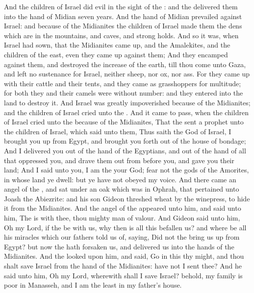 \begin{biblechapter} %
 And the children of Israel did evil in the sight of the \LORD: and the \LORD delivered them into the hand of Midian seven years.
\verse And the hand of Midian prevailed against Israel: and because of the Midianites the children of Israel made them the dens which are in the mountains, and caves, and strong holds.
\verse And so it was, when Israel had sown, that the Midianites came up, and the Amalekites, and the children of the east, even they came up against them;
\verse And they encamped against them, and destroyed the increase of the earth, till thou come unto Gaza, and left no sustenance for Israel, neither sheep, nor ox, nor ass.
\verse For they came up with their cattle and their tents, and they came as grasshoppers for multitude; for both they and their camels were without number: and they entered into the land to destroy it.
\verse And Israel was greatly impoverished because of the Midianites; and the children of Israel cried unto the \LORD.
\verse And it came to pass, when the children of Israel cried unto the \LORD because of the Midianites,
\verse That the \LORD sent a prophet unto the children of Israel, which said unto them, Thus saith the \LORD God of Israel, I brought you up from Egypt, and brought you forth out of the house of bondage;
\verse And I delivered you out of the hand of the Egyptians, and out of the hand of all that oppressed you, and drave them out from before you, and gave you their land;
\verse And I said unto you, I am the \LORD your God; fear not the gods of the Amorites, in whose land ye dwell: but ye have not obeyed my voice.
\verse And there came an angel of the \LORD, and sat under an oak which was in Ophrah, that pertained unto Joash the Abiezrite: and his son Gideon threshed wheat by the winepress, to hide it from the Midianites.
\verse And the angel of the \LORD appeared unto him, and said unto him, The \LORD is with thee, thou mighty man of valour.
\verse And Gideon said unto him, Oh my Lord, if the \LORD be with us, why then is all this befallen us? and where be all his miracles which our fathers told us of, saying, Did not the \LORD bring us up from Egypt? but now the \LORD hath forsaken us, and delivered us into the hands of the Midianites.
\verse And the \LORD looked upon him, and said, Go in this thy might, and thou shalt save Israel from the hand of the Midianites: have not I sent thee?
\verse And he said unto him, Oh my Lord, wherewith shall I save Israel? behold, my family is poor in Manasseh, and I am the least in my father's house.

\end{biblechapter}
